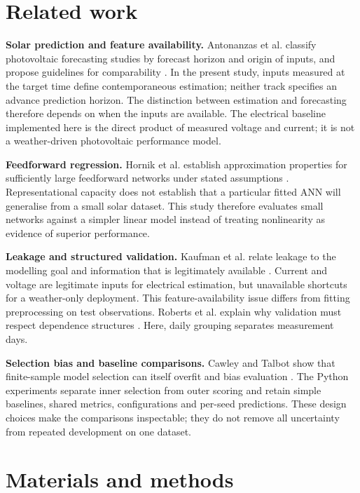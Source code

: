 \documentclass[10pt,journal,twoside]{IEEEtran}
\begin{document}
\section{Related work}


\textbf{Solar prediction and feature availability.} Antonanzas et al. classify photovoltaic forecasting
studies by forecast horizon and origin of inputs, and propose guidelines for comparability \cite{ref2}.
In the present study, inputs measured at the target time define contemporaneous estimation; neither
track specifies an advance prediction horizon. The distinction between estimation and forecasting therefore depends on when the inputs are available.
The electrical baseline implemented here is the direct product of measured voltage and current;
it is not a weather-driven photovoltaic performance model.

\textbf{Feedforward regression.} Hornik et al. establish approximation properties for sufficiently
large feedforward networks under stated assumptions \cite{ref3}. Representational capacity
does not establish that a particular fitted ANN will generalise from a small solar dataset.
This study therefore evaluates small networks against a simpler linear model instead of treating
nonlinearity as evidence of superior performance.

\textbf{Leakage and structured validation.} Kaufman et al. relate leakage to the modelling goal and
information that is legitimately available \cite{ref4}. Current and voltage are legitimate
inputs for electrical estimation, but unavailable shortcuts for a weather-only deployment.
This feature-availability issue differs from fitting preprocessing on test observations.
Roberts et al. explain why validation must respect dependence structures \cite{ref5}.
Here, daily grouping separates measurement days.

\textbf{Selection bias and baseline comparisons.} Cawley and Talbot show that finite-sample model
selection can itself overfit and bias evaluation \cite{ref6}. The Python experiments separate
inner selection from outer scoring and retain simple baselines, shared metrics, configurations
and per-seed predictions. These design choices make the comparisons inspectable; they do not
remove all uncertainty from repeated development on one dataset.


\section{Materials and methods}
\end{document}
